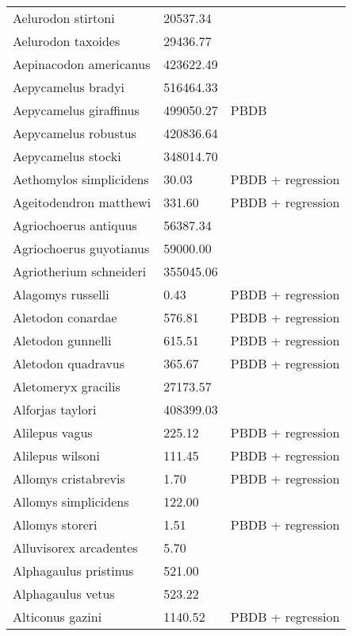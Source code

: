 \documentclass{article}
\begin{document}
\begin{center}
\begin{longtable}{p{} p{} p{}}
    Aelurodon stirtoni & 20537.34 & \cite{Tomiya2013} \\ 
    Aelurodon taxoides & 29436.77 & \cite{Tomiya2013} \\ 
    Aepinacodon americanus & 423622.49 & \cite{Baskin2011} \\ 
    Aepycamelus bradyi & 516464.33 & \cite{Dawson2012} \\ 
    Aepycamelus giraffinus & 499050.27 & PBDB \\ 
    Aepycamelus robustus & 420836.64 & \cite{Tomiya2013} \\ 
    Aepycamelus stocki & 348014.70 & \cite{Tomiya2013} \\ 
    Aethomylos simplicidens & 30.03 & PBDB + regression \\ 
    Ageitodendron matthewi & 331.60 & PBDB + regression \\ 
    Agriochoerus antiquus & 56387.34 & \cite{Tomiya2013} \\ 
    Agriochoerus guyotianus & 59000.00 & \cite{McKenna2011} \\ 
    Agriotherium schneideri & 355045.06 & \cite{Tomiya2013} \\ 
    Alagomys russelli & 0.43 & PBDB + regression \\ 
    Aletodon conardae & 576.81 & PBDB + regression \\ 
    Aletodon gunnelli & 615.51 & PBDB + regression \\ 
    Aletodon quadravus & 365.67 & PBDB + regression \\ 
    Aletomeryx gracilis & 27173.57 & \cite{Tomiya2013} \\ 
    Alforjas taylori & 408399.03 & \cite{Tomiya2013} \\ 
    Alilepus vagus & 225.12 & PBDB + regression \\ 
    Alilepus wilsoni & 111.45 & PBDB + regression \\ 
    Allomys cristabrevis & 1.70 & PBDB + regression \\ 
    Allomys simplicidens & 122.00 & \cite{McKenna2011} \\ 
    Allomys storeri & 1.51 & PBDB + regression \\ 
    Alluvisorex arcadentes & 5.70 & \cite{Tomiya2013} \\ 
    Alphagaulus pristinus & 521.00 & \cite{McKenna2011} \\ 
    Alphagaulus vetus & 523.22 & \cite{Tomiya2013} \\ 
    Alticonus gazini & 1140.52 & PBDB + regression \\ 

\end{longtable}
\end{center}
\end{document}
